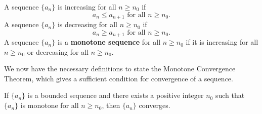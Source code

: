 \documentclass{report}
\begin{document}
    \bigbreak \noindent 
    \begin{definition}[]
        A sequence \( \{a_n\} \) is increasing for all \( n \geq n_0 \) if
        \[ a_n \leq a_{n+1} \text{ for all } n \geq n_0. \]
        \bigbreak \noindent 
        A sequence \( \{a_n\} \) is decreasing for all \( n \geq n_0 \) if
        \[ a_n \geq a_{n+1} \text{ for all } n \geq n_0. \]
        A sequence \( \{a_n\} \) is a \textbf{monotone sequence} for all \( n \geq n_0 \) if it is increasing for all \( n \geq n_0 \) or decreasing for all \( n \geq n_0 \).
    \end{definition}

    \bigbreak \noindent \bigbreak \noindent 
    We now have the necessary definitions to state the Monotone Convergence Theorem, which gives a sufficient condition for convergence of a sequence.
    \begin{thrm}
        If \( \{a_n\} \) is a bounded sequence and there exists a positive integer \( n_0 \) such that \( \{a_n\} \) is monotone for all \( n \geq n_0 \), then \( \{a_n\} \) converges.
    \end{thrm}
    
    
            


    

      


      


      

      

    





    
\end{document}
